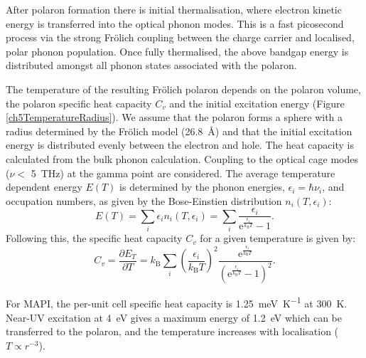 \begin{table}
After polaron formation there is initial thermalisation, where electron kinetic energy is transferred into the optical phonon modes. This is a fast picosecond process via the strong Fr\"{o}lich coupling between the charge carrier and localised, polar phonon population. Once fully thermalised, the above bandgap energy is distributed amongst all phonon states associated with the polaron.

The temperature of the resulting Fr\"{o}lich polaron depends on the polaron volume, the polaron specific heat capacity $C_v$ and the initial excitation energy (Figure \ref{ch5TemperatureRadius}). We assume that the polaron forms a sphere with a radius determined by the Fr\"{o}lich model (\SI{26.8}{\angstrom}) and that the initial excitation energy is distributed evenly between the electron and hole. 
The heat capacity is calculated from the bulk phonon calculation. Coupling to the optical cage modes ($\nu <$ \SI{5}{\tera\hertz}\autocite{Leguy2016}) at the gamma point are considered. The average temperature dependent energy $E(T)$ is determined by the phonon energies, $\epsilon_i = \hbar\nu_i$, and occupation numbers, as given by the Bose-Einstien distribution $n_i(T,\epsilon_i)$:
\begin{equation}
    E(T) = \sum_i \epsilon_i n_i(T,\epsilon_i) = \sum_i \frac{\epsilon_i}{\textrm{e}^{\frac{\epsilon_i}{k_\mathrm{B}T}}-1}.
\end{equation}
Following this, the specific heat capacity $C_v$ for a given temperature is given by:
\begin{equation}
    C_v = \frac{\partial E_T}{\partial T} = k_\mathrm{B} \sum_i \left(\frac{\epsilon_i}{k_\mathrm{B}T}\right)^2 \frac{\textrm{e}^{\frac{\epsilon_i}{k_\mathrm{B}T}}}{\left(\textrm{e}^{\frac{\epsilon_i}{k_\mathrm{B}T}}-1\right)^2}.
\end{equation}

For MAPI, the per-unit cell specific heat capacity is \SI{1.25}{\milli\eV\per\K} at
\SI{300}{\K}. Near-UV excitation at \SI{4}{\eV} gives a maximum energy of \SI{1.2}{\eV} which can be transferred to the polaron, and the temperature increases with localisation ($T \propto r^{-3}$).


\end{table}
